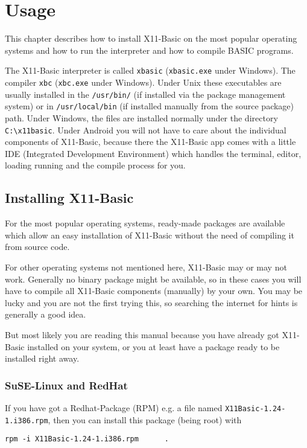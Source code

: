 \chapter{Usage}

This chapter describes how to install X11-Basic on the most popular operating 
systems and how to run the interpreter and how to compile BASIC programs.

The X11-Basic interpreter is called \verb|xbasic| (\verb|xbasic.exe| under 
Windows). The compiler \verb|xbc| (\verb|xbc.exe| under  Windows). Under Unix
these executables are usually installed in the \verb|/usr/bin/| (if installed
via  the package management system) or in \verb|/usr/local/bin|  (if installed
manually from the source package) path. Under Windows, the files are installed
normally under the directory \verb|C:\x11basic|. Under Android you will not have
to care about the individual components of X11-Basic,  because there the
X11-Basic app comes with a little IDE  (Integrated Development Environment)
which handles the terminal, editor, loading running and the compile process 
for you.

\section{Installing X11-Basic}

For the most popular operating systems, ready-made packages are  available which
allow an easy installation of X11-Basic without the  need of compiling it from
source code. 

For other operating systems not mentioned here, X11-Basic may or may not work. 
Generally no binary package might be available, so in these cases you will have 
to compile all X11-Basic components (manually) by your own. You may be lucky 
and you are not the first trying this, so searching the internet for hints is 
generally a good idea.

But most likely you are reading this manual because you have already got 
X11-Basic installed on your system, or you at least have a package ready 
to be installed right away.

\subsection*{SuSE-Linux and RedHat}

If you have got a Redhat-Package (RPM) e.g. a file named 
\verb|X11Basic-1.24-1.i386.rpm|, then you can install this package (being
root) with 
\begin{verbatim}
rpm -i X11Basic-1.24-1.i386.rpm      .
\end{verbatim}

